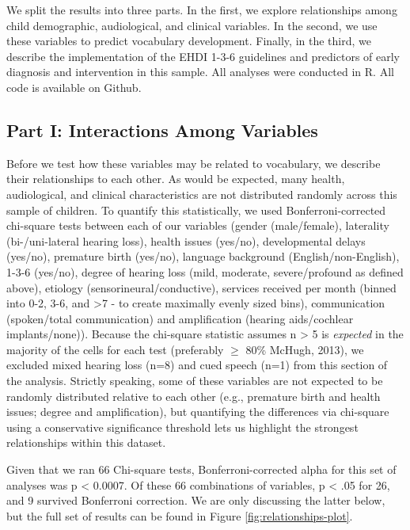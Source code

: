 \documentclass[
  english,
  man]{apa6}
\begin{document}
We split the results into three parts. In the first, we explore relationships among child demographic, audiological, and clinical variables. In the second, we use these variables to predict vocabulary development. Finally, in the third, we describe the implementation of the EHDI 1-3-6 guidelines and predictors of early diagnosis and intervention in this sample. All analyses were conducted in R. All code is available on Github.

\hypertarget{part-i-interactions-among-variables}{%
\subsection{Part I: Interactions Among Variables}\label{part-i-interactions-among-variables}}

Before we test how these variables may be related to vocabulary, we describe their relationships to each other. As would be expected, many health, audiological, and clinical characteristics are not distributed randomly across this sample of children. To quantify this statistically, we used Bonferroni-corrected chi-square tests between each of our variables (gender (male/female), laterality (bi-/uni-lateral hearing loss), health issues (yes/no), developmental delays (yes/no), premature birth (yes/no), language background (English/non-English), 1-3-6 (yes/no), degree of hearing loss (mild, moderate, severe/profound as defined above), etiology (sensorineural/conductive), services received per month (binned into 0-2, 3-6, and \textgreater7 - to create maximally evenly sized bins), communication (spoken/total communication) and amplification (hearing aids/cochlear implants/none)). Because the chi-square statistic assumes n \textgreater{} 5 is \emph{expected} in the majority of the cells for each test (preferably \(\geq\) 80\% McHugh, 2013), we excluded mixed hearing loss (n=8) and cued speech (n=1) from this section of the analysis. Strictly speaking, some of these variables are not expected to be randomly distributed relative to each other (e.g., premature birth and health issues; degree and amplification), but quantifying the differences via chi-square using a conservative significance threshold lets us highlight the strongest relationships within this dataset.

Given that we ran 66 Chi-square tests, Bonferroni-corrected alpha for this set of analyses was p \textless{} 0.0007. Of these 66 combinations of variables, p \textless{} .05 for 26, and 9 survived Bonferroni correction. We are only discussing the latter below, but the full set of results can be found in Figure \ref{fig:relationships-plot}.
\end{document}
